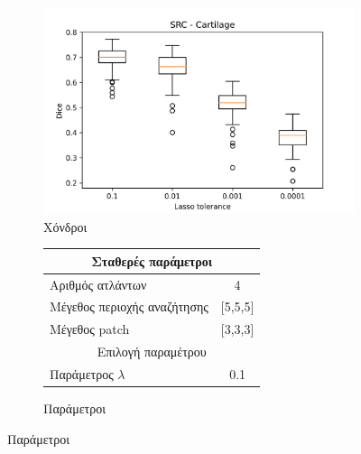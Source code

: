 \documentclass{beamer}
\begin{document}
\begin{frame}
\begin{figure}[H]
    \begin{subfigure}[b]{0.42\linewidth}
    \includegraphics[width=\linewidth]{SRC_Lasso_tolerance_Cartilage_plot.png}
    \caption{Χόνδροι}
    \end{subfigure}
    \begin{subfigure}[b]{0.42\linewidth}
        \begin{tabular}[t]{|l|c|} 
            \multicolumn{2}{c}{\footnotesize Σταθερές παράμετροι} \\
            \hline
            \footnotesize Αριθμός ατλάντων & \footnotesize  4 \\ 
            \hline
            \footnotesize Μέγεθος περιοχής αναζήτησης & \footnotesize  [5,5,5] \\ 
            \hline
            \footnotesize Μέγεθος patch & \footnotesize [3,3,3] \\
            \hline
            \multicolumn{2}{c}{\footnotesize Επιλογή παραμέτρου} \\
            \hline
            \footnotesize Παράμετρος $\lambda$ & \footnotesize 0.1 \\
            \hline
        \end{tabular}
    \caption{Παράμετροι}
    \end{subfigure}
\end{figure}

\end{frame}
\end{document}
